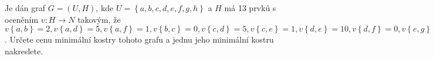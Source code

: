 Je dán graf $G=(U,H)$, kde $U=\left \{a,b,c,d,e,f,g,h  \right \}$ a $H$ má 13
prvků s oceněním $v:H\rightarrow N$ takovým, že $v\left \{ a,b \right \}=2,
v\left \{ a,d \right \}=5, v\left \{ a,f \right \}=1, v\left \{ b,c \right \}=0,
v\left \{ c,d \right \}=5, v\left \{ c,e \right \}=1, v\left \{ d,e \right \}=10,
v\left \{ d,f \right \}=0, v\left \{ e,g \right \}=3, v\left \{ e,h \right \}=3,
v\left \{ f,g \right \}=1, v\left \{ f,h \right \}=2, v\left \{ g,h \right \}=6 $. 
Určete cenu minimální kostry tohoto grafu a jednu jeho minimální kostru
nakreslete.
